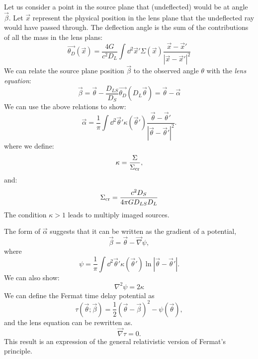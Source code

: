 Let us consider a point in the source plane that (undeflected) would
be at angle $\vec{\beta}$. Let $\vec{x}$ represent the physical
position in the lens plane that the undeflected ray would have passed
through.  The deflection angle is the sum of the contributions of all
the mass in the lens plans:
\begin{equation}
\vec{\theta_D}\left(\vec{x}\right) = \frac{4G}{c^2
D_L}  \int \dd^2 \vec{x}' \Sigma\left(\vec{x}\right) \frac{\vec{x}
- \vec{x}'}{\left|\vec{x} - \vec{x}'\right|^2}
\end{equation}
We can relate the source plane position $\vec{\beta}$ to the observed
angle $\theta$ with the {\it lens equation}:
\begin{equation}
\vec{\beta} = \vec{\theta}
- \frac{D_{LS}}{D_S} \vec{\theta_D}\left(D_L \vec{\theta}\right)
  = \vec{\theta} - \vec{\alpha}
\end{equation}
We can use the above relations to show:
\begin{equation}
\vec{\alpha}
= \frac{1}{\pi} \int \dd^2\vec{\theta}' \kappa\left(\vec{\theta}'\right)
\frac{\vec{\theta} - \vec{\theta}'}
{\left|\vec{\theta} - \vec{\theta}'\right|^2}.
\end{equation}
where we define:
\begin{equation}
\kappa = \frac{\Sigma}{\Sigma_{\rm cr}},
\end{equation}
and:
\begin{equation}
\Sigma_{\rm cr} = \frac{c^2 D_S}{4\pi G D_{LS} D_L}
\end{equation}
The condition $\kappa>1$ leads to multiply imaged sources.

The form of $\vec{\alpha}$ suggests that it can be written as the
gradient of a potential,
\begin{equation}
\vec{\beta} = \vec{\theta} - \vec{\nabla}\psi,
\end{equation}
where
\begin{equation}
\psi
= \frac{1}{\pi} \int \dd^2\vec{\theta}' \kappa\left(\vec{\theta}'\right)
\ln \left|\vec{\theta} - \vec{\theta}'\right|.
\end{equation}
We can also show:
\begin{equation}
\nabla^2\psi = 2 \kappa
\end{equation}
We can define the Fermat time delay potential as
\begin{equation}
\tau\left(\vec{\theta}; \vec{\beta}\right) =
\frac{1}{2} \left(\vec{\theta} - \vec{\beta}\right)^2
- \psi\left(\vec{\theta}\right),
\end{equation}
and the lens equation can be rewritten as.
\begin{equation}
\vec{\nabla}\tau = 0.
\end{equation}
This result is an expression of the general relativistic version of
Fermat's principle.

